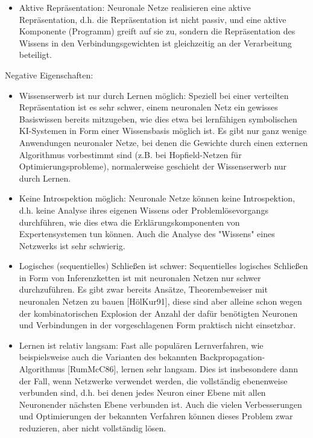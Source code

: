 \begin{itemize}[noitemsep]
\item Aktive Repräsentation: Neuronale Netze realisieren eine aktive
Repräsentation, d.h. die Repräsentation ist nicht passiv, und eine aktive
Komponente (Programm) greift auf sie zu, sondern die Repräsentation des
Wissens in den Verbindungsgewichten ist gleichzeitig an der Verarbeitung
beteiligt.
\end{itemize}

Negative Eigenschaften:

\begin{itemize}[noitemsep]
\item Wissenserwerb ist nur durch Lernen möglich: Speziell bei einer verteilten
Repräsentation ist es sehr schwer, einem neuronalen Netz ein gewisses
Basiswissen bereits mitzugeben, wie dies etwa bei lernfähigen symbolischen
KI-Systemen in Form einer Wissensbasis möglich ist. Es gibt nur ganz
wenige Anwendungen neuronaler Netze, bei denen die Gewichte durch einen
externen Algorithmus vorbestimmt sind (z.B. bei Hopfield-Netzen für
Optimierungsprobleme), normalerweise geschieht der Wissenserwerb nur
durch Lernen.
\item Keine Introspektion möglich: Neuronale Netze können keine Introspektion,
d.h. keine Analyse ihres eigenen Wissens oder Problemlösevorgangs
durchführen, wie dies etwa die Erklärungskomponenten von
Expertensystemen tun können. Auch die Analyse des "Wissens" eines
Netzwerks ist sehr schwierig.
\item Logisches (sequentielles) Schließen ist schwer: Sequentielles logisches
Schließen in Form von Inferenzketten ist mit neuronalen Netzen nur schwer
durchzuführen. Es gibt zwar bereits Ansätze, Theorembeweiser mit
neuronalen Netzen zu bauen [HölKur91], diese sind aber alleine schon
wegen der kombinatorischen Explosion der Anzahl der dafür benötigten
Neuronen und Verbindungen in der vorgeschlagenen Form praktisch nicht
einsetzbar.
\item Lernen ist relativ langsam: Fast alle populären Lernverfahren, wie
beispielsweise auch die Varianten des bekannten Backpropagation-
Algorithmus [RumMcC86], lernen sehr langsam. Dies ist insbesondere dann
der Fall, wenn Netzwerke verwendet werden, die vollständig ebenenweise
verbunden sind, d.h. bei denen jedes Neuron einer Ebene mit allen Neuronender nächsten Ebene verbunden ist. Auch die vielen Verbesserungen und
Optimierungen der bekannten Verfahren können dieses Problem zwar
reduzieren, aber nicht vollständig lösen.
\end{itemize}

